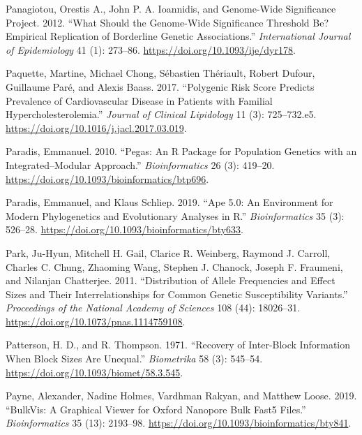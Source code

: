 \documentclass[
]{book}
\newlength{\cslhangindent}
\newlength{\cslentryspacingunit} %
\newenvironment{CSLReferences}[2] %
 {%
  \setlength{\parindent}{0pt}
  \ifodd #1
  \let\oldpar\par
  \def\par{\hangindent=\cslhangindent\oldpar}
  \fi
  \setlength{\parskip}{#2\cslentryspacingunit}
 }%
 {}
\begin{document}
\begin{CSLReferences}{1}{0}
\leavevmode{}%
Panagiotou, Orestis A., John P. A. Ioannidis, and Genome-Wide Significance Project. 2012. {``What Should the Genome-Wide Significance Threshold Be? {Empirical} Replication of Borderline Genetic Associations.''} \emph{International Journal of Epidemiology} 41 (1): 273--86. \url{https://doi.org/10.1093/ije/dyr178}.

\leavevmode{}%
Paquette, Martine, Michael Chong, Sébastien Thériault, Robert Dufour, Guillaume Paré, and Alexis Baass. 2017. {``Polygenic Risk Score Predicts Prevalence of Cardiovascular Disease in Patients with Familial Hypercholesterolemia.''} \emph{Journal of Clinical Lipidology} 11 (3): 725--732.e5. \url{https://doi.org/10.1016/j.jacl.2017.03.019}.

\leavevmode{}%
Paradis, Emmanuel. 2010. {``Pegas: An {R} Package for Population Genetics with an Integrated--Modular Approach.''} \emph{Bioinformatics} 26 (3): 419--20. \url{https://doi.org/10.1093/bioinformatics/btp696}.

\leavevmode{}%
Paradis, Emmanuel, and Klaus Schliep. 2019. {``Ape 5.0: An Environment for Modern Phylogenetics and Evolutionary Analyses in {R}.''} \emph{Bioinformatics} 35 (3): 526--28. \url{https://doi.org/10.1093/bioinformatics/bty633}.

\leavevmode{}%
Park, Ju-Hyun, Mitchell H. Gail, Clarice R. Weinberg, Raymond J. Carroll, Charles C. Chung, Zhaoming Wang, Stephen J. Chanock, Joseph F. Fraumeni, and Nilanjan Chatterjee. 2011. {``Distribution of Allele Frequencies and Effect Sizes and Their Interrelationships for Common Genetic Susceptibility Variants.''} \emph{Proceedings of the National Academy of Sciences} 108 (44): 18026--31. \url{https://doi.org/10.1073/pnas.1114759108}.

\leavevmode{}%
Patterson, H. D., and R. Thompson. 1971. {``Recovery of Inter-Block Information When Block Sizes Are Unequal.''} \emph{Biometrika} 58 (3): 545--54. \url{https://doi.org/10.1093/biomet/58.3.545}.

\leavevmode{}%
Payne, Alexander, Nadine Holmes, Vardhman Rakyan, and Matthew Loose. 2019. {``{BulkVis}: A Graphical Viewer for {Oxford} Nanopore Bulk {Fast5} Files.''} \emph{Bioinformatics} 35 (13): 2193--98. \url{https://doi.org/10.1093/bioinformatics/bty841}.


\end{CSLReferences}
\end{document}
